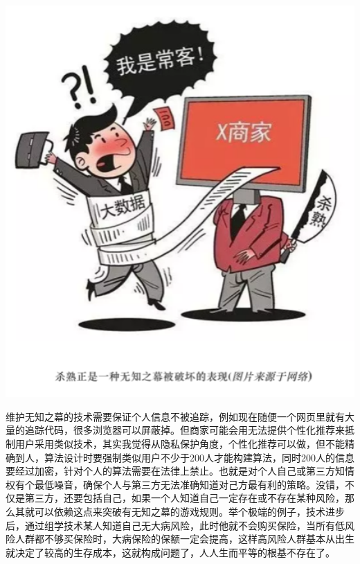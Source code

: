 \documentclass[]{book}
\begin{document}
\includegraphics[width=5.94in]{images/wuzhi3}

维护无知之幕的技术需要保证个人信息不被追踪，例如现在随便一个网页里就有大量的追踪代码，很多浏览器可以屏蔽掉。但商家可能会用无法提供个性化推荐来抵制用户采用类似技术，其实我觉得从隐私保护角度，个性化推荐可以做，但不能精确到人，算法设计时要强制类似用户不少于200人才能构建算法，同时200人的信息要经过加密，针对个人的算法需要在法律上禁止。也就是对个人自己或第三方知情权有个最低噪音，确保个人与第三方无法准确知道对己方最有利的策略。没错，不仅是第三方，还要包括自己，如果一个人知道自己一定存在或不存在某种风险，那么其就可以依赖这点来突破有无知之幕的游戏规则。举个极端的例子，技术进步后，通过组学技术某人知道自己无大病风险，此时他就不会购买保险，当所有低风险人群都不够买保险时，大病保险的保额一定会提高，这样高风险人群基本从出生就决定了较高的生存成本，这就构成问题了，人人生而平等的根基不存在了。　
\end{document}
